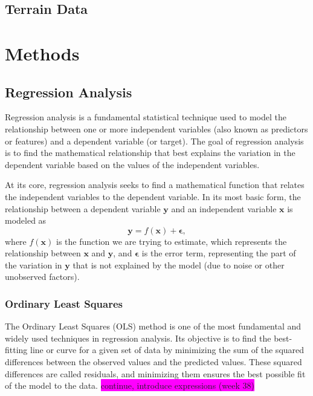 \documentclass[aps,pra,english,notitlepage,reprint,nofootinbib]{revtex4-1}  %
\begin{document}
\subsection{Terrain Data}\label{subsec:terrain}
      


\section{Methods}\label{sec:methods}
\subsection{Regression Analysis}
Regression analysis is a fundamental statistical technique used to model the relationship between one or more independent variables (also known as predictors or features) and a dependent variable (or target). The goal of regression analysis is to find the mathematical relationship that best explains the variation in the dependent variable based on the values of the independent variables.

At its core, regression analysis seeks to find a mathematical function that relates the independent variables to the dependent variable. In its most basic form, the relationship between a dependent variable $\mathbf{y}$ and an independent variable $\mathbf{x}$ is modeled as
\begin{equation}
  \mathbf{y} = f(\mathbf{x}) + \boldsymbol{\epsilon},
\end{equation}
where $f(\mathbf{x})$ is the function we are trying to estimate, which represents the relationship between $\mathbf{x}$ and $\mathbf{y}$, and $\boldsymbol{\epsilon}$ is the error term, representing the part of the variation in $\mathbf{y}$ that is not explained by the model (due to noise or other unobserved factors).

\subsubsection{Ordinary Least Squares}\label{subsubsec:ols}
The Ordinary Least Squares (OLS) method is one of the most fundamental and widely used techniques in regression analysis. Its objective is to find the best-fitting line or curve for a given set of data by minimizing the sum of the squared differences between the observed values and the predicted values. These squared differences are called residuals, and minimizing them ensures the best possible fit of the model to the data. \colorbox{magenta}{continue, introduce expressions (week 38)}
\end{document}
